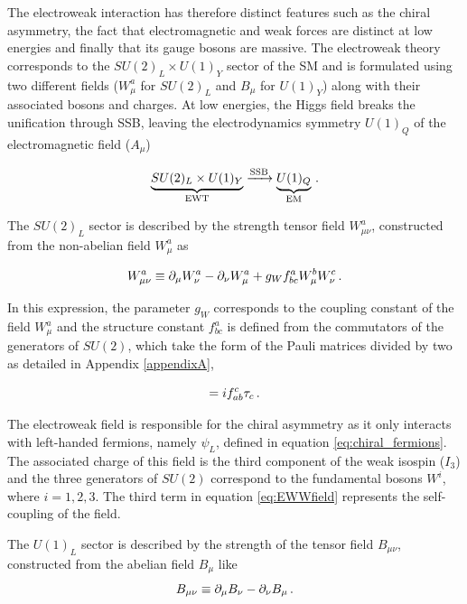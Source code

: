 The electroweak interaction has therefore distinct features such as the chiral asymmetry, the fact that electromagnetic and weak forces are distinct at low energies and finally that its gauge bosons are massive. The electroweak theory corresponds to the $SU(2)_L \times U(1)_Y$ sector of the SM and is formulated using two different fields ($W_{\mu}^a$ for $SU(2)_L$ and $B_{\mu}$ for $U(1)_Y$) along with their associated bosons and charges. At low energies, the Higgs field breaks the unification through SSB, leaving the electrodynamics symmetry $U(1)_Q$ of the electromagnetic field ($A_{\mu}$)

\begin{equation}
    \underbrace{SU(2)_L \times U(1)_Y}_\text{EWT} \xrightarrow{\text{SSB}} \underbrace{U(1)_Q}_{\text{EM}} \mend
\end{equation}

The $SU(2)_L$ sector is described by the strength tensor field $W_{\mu\nu}^a$, constructed from the non-abelian field $W_{\mu}^a$ as

\begin{equation}
    W_{\mu\nu}^a \equiv \partial_{\mu} W_{\nu}^a - \partial_{\nu} W_{\mu}^a + g_W f_{bc}^a W_{\mu}^b W_{\nu}^c \mend
    \label{eq:EWWfield}
\end{equation}

In this expression, the parameter $g_W$ corresponds to the coupling constant of the field $W_{\mu}^a$ and the structure constant $f_{bc}^a$ is defined from the commutators of the generators of $SU(2)$, which take the form of the Pauli matrices divided by two as detailed in Appendix \ref{appendixA},

\begin{equation}
    [\tau_a , \tau_b] = if_{ab}^c \tau_c \mend
\end{equation}

The electroweak field is responsible for the chiral asymmetry as it only interacts with left-handed fermions, namely $\psi_L$, defined in equation \ref{eq:chiral_fermions}. The associated charge of this field is the third component of the weak isospin ($I_3$) and the three generators of $SU(2)$ correspond to the fundamental bosons $W^i$, where $i = {1,2,3}$. The third term in equation \ref{eq:EWWfield} represents the self-coupling of the field.

The $U(1)_L$ sector is described by the strength of the tensor field $B_{\mu\nu}$, constructed from the abelian field $B_{\mu}$ like
\begin{equation}
    B_{\mu\nu} \equiv \partial_{\mu}B_{\nu} - \partial_{\nu}B_{\mu} \mend
\end{equation}

